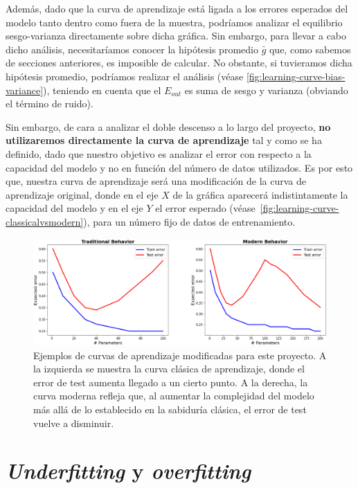 Además, dado que la curva de aprendizaje está ligada a los errores esperados del modelo tanto dentro como fuera de la muestra, podríamos analizar el equilibrio sesgo-varianza directamente sobre dicha gráfica. Sin embargo, para llevar a cabo dicho análisis, necesitaríamos conocer la hipótesis promedio $\bar{g}$ que, como sabemos de secciones anteriores, es imposible de calcular. No obstante, si tuvieramos dicha hipótesis promedio, podríamos realizar el análisis (véase \autoref{fig:learning-curve-bias-variance}), teniendo en cuenta que el $E_{out}$ es suma de sesgo y varianza (obviando el término de ruido).

Sin embargo, de cara a analizar el doble descenso a lo largo del proyecto, \textbf{no utilizaremos directamente la curva de aprendizaje} tal y como se ha definido, dado que nuestro objetivo es analizar el error con respecto a la capacidad del modelo y no en función del número de datos utilizados. Es por esto que, nuestra curva de aprendizaje será una modificación de la curva de aprendizaje original, donde en el eje $X$ de la gráfica aparecerá indistintamente la capacidad del modelo y en el eje $Y$ el error esperado (véase~\autoref{fig:learning-curve-classicalvsmodern}), para un número fijo de datos de entrenamiento.

\begin{figure}[h]
    \centering
    \includegraphics[width=0.8\linewidth]{img/learning-curve-classicalvsmodern.png}
    \caption[Ejemplos de curvas de aprendizaje modificadas para este proyecto.] {Ejemplos de curvas de aprendizaje modificadas para este proyecto. A la izquierda se muestra la curva clásica de aprendizaje, donde el error de test aumenta llegado a un cierto punto. A la derecha, la curva moderna refleja que, al aumentar la complejidad del modelo más allá de lo establecido en la sabiduría clásica, el error de test vuelve a disminuir.}\label{fig:learning-curve-classicalvsmodern}
\end{figure}

\section{\textit{Underfitting} y \textit{overfitting}}\label{sec:subsec-underfitting-y-overfitting}


